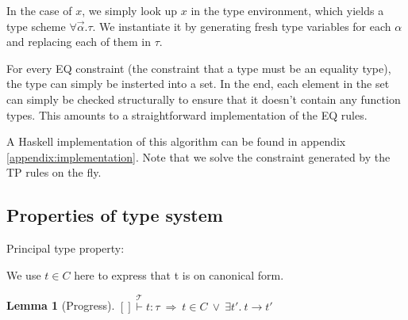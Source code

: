 \documentclass[a4paper]{article}
\newcommand{\im}{\Rightarrow}
\newcommand{\step}{\to}
\newcommand{\T}{\mathcal{T}}
\newcommand{\stackover}[2]{\stackrel{{#2}}{#1}}
\newtheorem{lemma}{Lemma}[section]
\begin{document}
In the case of $x$, we simply look up $x$ in the type environment,
which yields a type scheme $\forall \vec{\alpha}.\tau$. We
instantiate it by generating fresh type variables for each $\alpha$
and replacing each of them in $\tau$.

For every EQ constraint (the constraint that a type must be an
equality type), the type can simply be insterted into a set.
In the end, each element in the set can simply be checked
structurally to ensure that it doesn't contain any function types.
This amounts to a straightforward implementation of the EQ rules.

A Haskell implementation of this algorithm can be found in appendix
\ref{appendix:implementation}. Note that we solve the constraint
generated by the TP rules on the fly.

\subsection{Properties of type system}
\label{syntacticProperties}
\label{sec:proofs}

Principal type property:

We use $t \in C$ here to express that t is on canonical form.

\begin{lemma}[Progress]
\label{lemma:progress}
$\stackover{[]\vdash t:\tau}{\T}\ \im\ t \in C\  \lor\  \exists t'.\ t\step t'$
\end{lemma}
\end{document}
